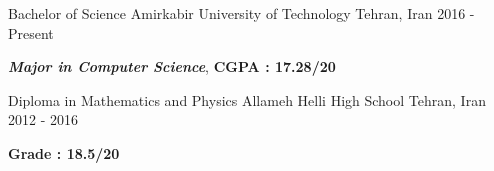 \documentclass[11pt, a4paper]{awesome-cv}
\begin{document}
\begin{cventries}
	
	\cventry
	{Bachelor of Science} %
	{Amirkabir University of Technology} %
	{Tehran, Iran} %
	{ 2016 - Present} %
	{
		\begin{cvitems} %
			\item {\textit{\textbf{Major in Computer Science}}, \textbf{CGPA : 17.28/20}}
		\end{cvitems}
	}
	\cventry
	{Diploma in Mathematics and Physics} %
	{Allameh Helli High School} %
	{Tehran, Iran} %
	{ 2012 - 2016} %
	{    
		\begin{cvitems} %
			\item {\textbf{Grade : 18.5/20}}\\
		\end{cvitems}
	}
\end{cventries}

\end{document}
